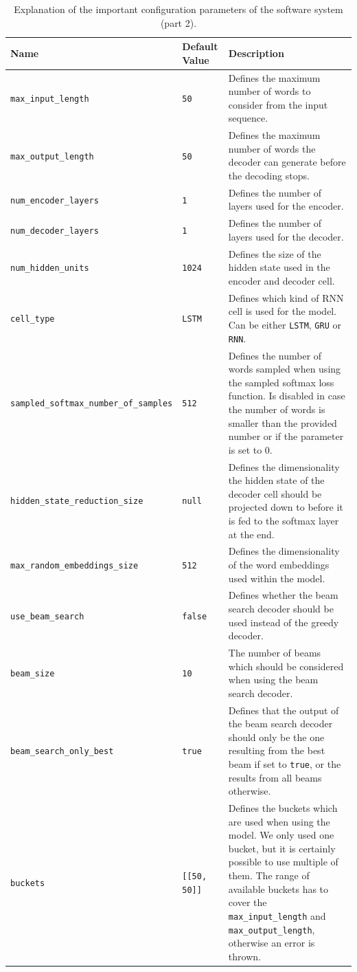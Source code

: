 \begin{table}[H]
	\centering
	\begin{adjustbox}{max width=\textwidth, max height=\textheight}
		\begin{tabular}{llp{10cm}}
		\toprule
		Name & Default Value & Description\\ \midrule
		\texttt{max{\_}input\_length} & \texttt{50} & Defines the maximum number of words to consider from the input sequence.\\
		\texttt{max{\_}output\_length} & \texttt{50} & Defines the maximum number of words the decoder can generate before the decoding stops.\\
		\texttt{num{\_}encoder\_layers} & \texttt{1} & Defines the number of layers used for the encoder.\\
		\texttt{num{\_}decoder\_layers} & \texttt{1} & Defines the number of layers used for the decoder.\\
		\texttt{num{\_}hidden\_units} & \texttt{1024} & Defines the size of the hidden state used in the encoder and decoder cell.\\
		\texttt{cell{\_}type} & \texttt{LSTM} & Defines which kind of RNN cell is used for the model. Can be either \texttt{LSTM}, \texttt{GRU} or \texttt{RNN}.\\
		\texttt{sampled{\_}softmax\_number\_of\_samples} & \texttt{512} & Defines the number of words sampled when using the sampled softmax loss function. Is disabled in case the number of words is smaller than the provided number or if the parameter is set to 0.\\
		\texttt{hidden\_state\_reduction\_size} & \texttt{null} & Defines the dimensionality the hidden state of the decoder cell should be projected down to before it is fed to the softmax layer at the end.\\
		\texttt{max\_random\_embeddings\_size} & \texttt{512} & Defines the dimensionality of the word embeddings used within the model.\\
		\texttt{use\_beam\_search} & \texttt{false} & Defines whether the beam search decoder should be used instead of the greedy decoder.\\
		\texttt{beam\_size} & \texttt{10} & The number of beams which should be considered when using the beam search decoder.\\
		\texttt{beam\_search\_only\_best} & \texttt{true} & Defines that the output of the beam search decoder should only be the one resulting from the best beam if set to \texttt{true}, or the results from all beams otherwise.\\
		\texttt{buckets} & \texttt{[[50, 50]]} & Defines the buckets which are used when using the model. We only used one bucket, but it is certainly possible to use multiple of them. The range of available buckets has to cover the \texttt{max{\_}input\_length} and \texttt{max{\_}output\_length}, otherwise an error is thrown.\\
		\bottomrule
		\end{tabular}
	\end{adjustbox}
	\caption{Explanation of the important configuration parameters of the software system (part 2).}
\end{table}


